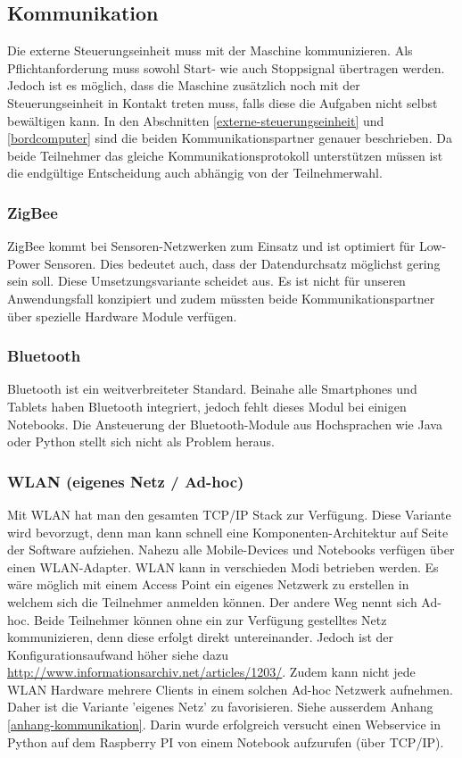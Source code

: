 \subsection{Kommunikation}
\label{sc_kommunikation}
Die externe Steuerungseinheit muss mit der Maschine kommunizieren. Als Pflichtanforderung muss sowohl Start- wie auch Stoppsignal übertragen werden. Jedoch ist es möglich, dass die Maschine zusätzlich noch mit der Steuerungseinheit in Kontakt treten muss, falls diese die Aufgaben nicht selbst bewältigen kann. In den Abschnitten \ref{externe-steuerungseinheit} und \ref{bordcomputer} sind die beiden Kommunikationspartner genauer beschrieben. Da beide Teilnehmer das gleiche Kommunikationsprotokoll unterstützen müssen ist die endgültige Entscheidung auch abhängig von der Teilnehmerwahl. 

\subsubsection{ZigBee}
ZigBee kommt bei Sensoren-Netzwerken zum Einsatz und ist optimiert für Low-Power Sensoren. Dies bedeutet auch, dass der Datendurchsatz möglichst gering sein soll. Diese Umsetzungsvariante scheidet aus. Es ist nicht für unseren Anwendungsfall konzipiert und zudem müssten beide Kommunikationspartner über spezielle Hardware Module verfügen.

\subsubsection{Bluetooth}
Bluetooth ist ein weitverbreiteter Standard. Beinahe alle Smartphones und Tablets haben Bluetooth integriert, jedoch fehlt dieses Modul bei einigen Notebooks. Die Ansteuerung der Bluetooth-Module aus Hochsprachen wie Java oder Python stellt sich nicht als Problem heraus.

\subsubsection{WLAN (eigenes Netz / Ad-hoc)}
Mit WLAN hat man den gesamten TCP/IP Stack zur Verfügung. Diese Variante wird bevorzugt, denn man kann schnell eine Komponenten-Architektur auf Seite der Software aufziehen. Nahezu alle Mobile-Devices und Notebooks verfügen über einen WLAN-Adapter.\newline
WLAN kann in verschieden Modi betrieben werden. Es wäre möglich mit einem Access Point ein eigenes Netzwerk zu erstellen in welchem sich die Teilnehmer anmelden können. Der andere Weg nennt sich Ad-hoc. Beide Teilnehmer können ohne ein zur Verfügung gestelltes Netz kommunizieren, denn diese erfolgt direkt untereinander. Jedoch ist der Konfigurationsaufwand höher siehe dazu \href{http://www.informationsarchiv.net/articles/1203/}{http://www.informationsarchiv.net/articles/1203/}. Zudem kann nicht jede WLAN Hardware mehrere Clients in einem solchen Ad-hoc Netzwerk aufnehmen. Daher ist die Variante 'eigenes Netz' zu favorisieren.\newline
\newline
Siehe ausserdem Anhang \ref{anhang-kommunikation}. Darin wurde erfolgreich versucht einen Webservice in Python auf dem Raspberry PI von einem Notebook aufzurufen (über TCP/IP).